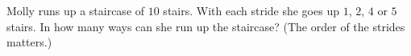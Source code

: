 Molly runs up a staircase of $10$ stairs. With each stride she goes up $1$, $2$, $4$ or $5$ stairs. In how many ways can she run up the staircase? (The order of the strides matters.)
